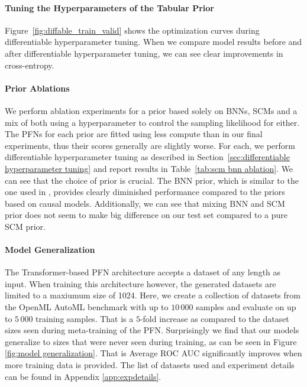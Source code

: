 \documentclass{article}
\begin{document}
\paragraph{Tuning the Hyperparameters of the Tabular Prior}
Figure~\ref{fig:diffable_train_valid} shows the optimization curves during differentiable hyperparameter tuning.
When we compare model results before and after differentiable hyperparameter tuning, we can see clear improvements in cross-entropy. 

\paragraph{Prior Ablations}
We perform ablation experiments for a prior based solely on BNNs, SCMs and a mix of both using a hyperparameter to control the sampling likelihood for either.
The PFNs for each prior are fitted using less compute than in our final experiments, thus their scores generally are slightly worse.
For each, we perform differentiable hyperparameter tuning as described in Section~\ref{sec:differentiable hyperparameter tuning} and report results in Table~\ref{tab:scm bnn ablation}. We can see that the choice of prior is crucial.
The BNN prior, which is similar to the one used in \citet{muller-iclr2022}, provides clearly diminished performance compared to the priors based on causal models.
Additionally, we can see that mixing BNN and SCM prior does not seem to make big difference on our test set compared to a pure SCM prior.

\begin{table}[htbp]
    \centering
    
    \vspace{.3cm}
    \caption{An evaluation of the impact of the prior mixing on the final performance. Our final model was trained in the \textit{SCM + BNN} setting, see Section \ref{sec:tabprior} for details on the priors.}
    \label{tab:scm bnn ablation}
\end{table}

\paragraph{Model Generalization}
The Transformer-based PFN architecture accepts a dataset of any length as input. When training this architecture however, the generated datasets are limited to a maxiumum size of 1024.
Here, we create a collection of datasets from the OpenML AutoML benchmark with up to $10\,000$ samples and evaluate on up to $5\,000$ training samples. That is a $5$-fold increase as compared to the dataset sizes seen during meta-training of the PFN.
Surprisingly we find that our models generalize to sizes that were never seen during training, as can be seen in Figure \ref{fig:model generalization}. That is Average ROC AUC significantly improves when more training data is provided.
The list of datasets used and experiment details can be found in Appendix \ref{app:expdetails}.
\end{document}
